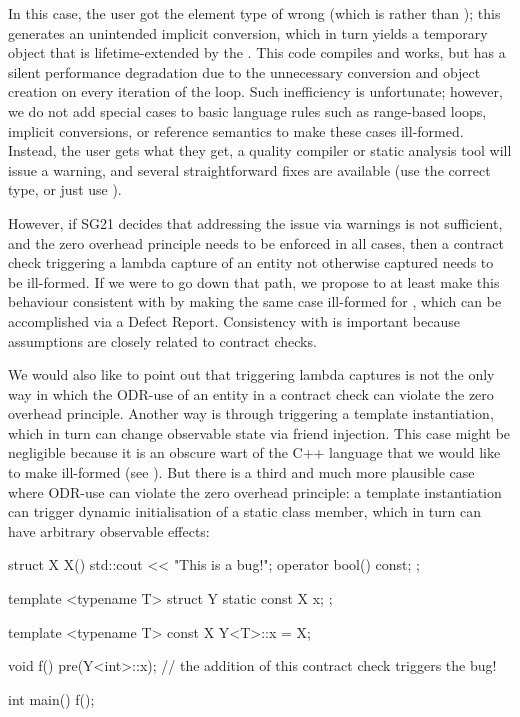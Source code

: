 In this case, the user got the element type of  wrong (which is  rather than ); this generates an unintended implicit conversion, which in turn yields a temporary object that is lifetime-extended by the . This code compiles and works, but has a silent performance degradation due to the unnecessary conversion and object creation on every iteration of the loop. Such inefficiency is unfortunate; however, we do not add special cases to basic language rules such as range-based  loops, implicit conversions, or reference semantics to make these cases ill-formed. Instead, the user gets what they get, a quality compiler or static analysis tool will issue a warning, and several straightforward fixes are available (use the correct type, or just use ).

However, if SG21 decides that addressing the issue via warnings is not sufficient, and the zero overhead principle needs to be enforced in all cases, then a contract check triggering a lambda capture of an entity not otherwise captured needs to be ill-formed. If we were to go down that path, we propose to at least make this behaviour consistent with \tcode{[[assume]]} by making the same case ill-formed for \tcode{[[assume]]}, which can be accomplished via a Defect Report. Consistency with \tcode{[[assume]]} is important because assumptions are closely related to contract checks.

We would also like to point out that triggering lambda captures is not the only way in which the ODR-use of an entity in a contract check can violate the zero overhead principle. Another way is through triggering a template instantiation, which in turn can change observable state via friend injection. This case might be negligible because it is an obscure wart of the C++ language that we would like to make ill-formed (see \cite{CWG2118}). But there is a third and much more plausible case where ODR-use can violate the zero overhead principle: a template instantiation can trigger dynamic initialisation of a static class member, which in turn can have arbitrary observable effects:

\begin{codeblock}
struct X {
  X() { std::cout << "This is a bug!\n"; }
  operator bool() const;
};

template <typename T>
struct Y {
  static const X x;
};

template <typename T>
const X Y<T>::x = X{};

void f()
  pre(Y<int>::x);  // the addition of this contract check triggers the bug!

int main() {
  f(); 
}
\end{codeblock}

